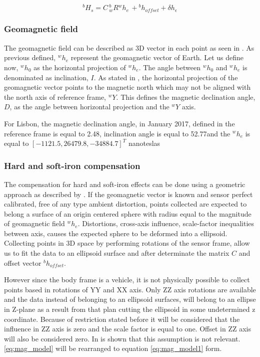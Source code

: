 \begin{equation}
{}^bH_{s}=C\,{}^b_wR{}^wh_e\, + {}^bh_{offset} + \delta h_{\epsilon}
\label{eq:mag_model}
\end{equation}


\subsubsection{Geomagnetic field}\label{subsubsection: geomagnetic_field}

The geomagnetic field can be described as 3D vector in each point as seen in
\cite{ipma_geomagnetism}. As previous defined, ${}^wh_e$ represent the
geomagnetic vector of Earth. Let us define now, ${}^wh_0$ as the
horizontal projection of ${}^wh_e$. The angle between ${}^wh_0$ and
${}^wh_e$ is denominated as inclination, $I$. As stated in
\cite{ipma_geomagnetism}, the horizontal projection of the geomagnetic vector
points to the magnetic north which may not be aligned with the north axis of
reference frame, ${}^wY$. This defines the magnetic declination angle, $D$, as the
angle between horizontal projection and the ${}^wY$ axis.

For Lisbon, the magnetic declination angle, in January 2017, defined in the reference
frame is equal to 2.48\degree, inclination angle is equal to 52.77\degree and
the ${}^wh_e$ is equal to $[-1121.5, 26479.8, -34884.7]^T$ nanoteslas
\cite{noaa}




\subsubsection{Hard and soft-iron compensation}

The compensation for hard and soft-iron effects can be done using a geometric
approach as described by \cite{magAN4246} \cite{Caruso2000}
\cite{Vasconcelos2011}. If the geomagnetic vector is known and sensor perfect
calibrated, free of any type ambient distortion, points collected are expected
to belong a surface of an origin centered sphere with radius equal to the
magnitude of geomagnetic field ${}^wh_e$. Distortions, cross-axis
influence, scale-factor inequalities between axis, causes the expected sphere to
be deformed into a ellipsoid. Collecting points in 3D space by performing
rotations of the sensor frame, allow us to fit the data to an ellipsoid surface
and after determinate the matrix $C$ and offset vector ${}^bh_{offset}$.

However since the body frame is a vehicle, it is not physically possible to
collect points based in rotations of YY and XX axis. Only ZZ axis rotations are
available and the data instead of belonging to an ellipsoid surfaces, will
belong to an ellipse in Z-plane as a result from that plan cutting the ellipsoid
in some undetermined z coordinate. Because of restriction stated before it will
be considered that the influence in ZZ axis is zero and the scale
factor is equal to one. Offset in ZZ axis will also be considered zero. In \cite{thesis_BT} is shown that this assumption is not relevant. \eqref{eq:mag_model} will be rearranged to equation \eqref{eq:mag_model1}
form.

